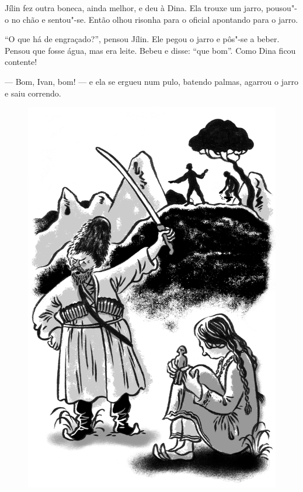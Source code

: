 Jílin fez outra boneca, ainda melhor, e deu à Dina. Ela trouxe um jarro,
pousou"-o no chão e sentou"-se. Então olhou risonha para o oficial
apontando para o jarro.

``O que há de engraçado?'', pensou Jílin. Ele pegou o jarro e pôs"-se a
beber. Pensou que fosse água, mas era leite. Bebeu e disse: ``que bom''.
Como Dina ficou contente!

--- Bom, Ivan, bom! --- e ela se ergueu num pulo, batendo palmas,
agarrou o jarro e saiu correndo.

\begin{figure}%
\vspace*{-1.6cm}
\hspace*{-2cm}\includegraphics[width=140mm]{./imgs/cena4.jpg}
\end{figure}

